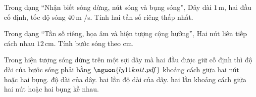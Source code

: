 \begin{ex}
Trong dạng “Nhận biết sóng dừng, nút sóng và bụng sóng”, Dây dài $1\,\text{m}$, hai đầu cố định, tốc độ sóng $40\,\text{m}$ /s. Tính hai tần số riêng thấp nhất.
\choiceTF

\end{ex}

\begin{ex}
Trong dạng “Tần số riêng, họa âm và hiện tượng cộng hưởng”, Hai nút liên tiếp cách nhau $12\,\text{cm}$. Tính bước sóng theo cm.
\end{ex}

\begin{ex}
Trong hiện tượng sóng dừng trên một sợi dây mà hai đầu được giữ cố định thì độ dài của bước sóng phải bằng $\nguon{ly11 kntt.pdf}$
\choice
{khoảng cách giữa hai nút hoặc hai bụng.}
{độ dài của dây.}
{hai lần độ dài của dây.}
{\True hai lần khoảng cách giữa hai nút hoặc hai bụng kề nhau.}
\end{ex}

